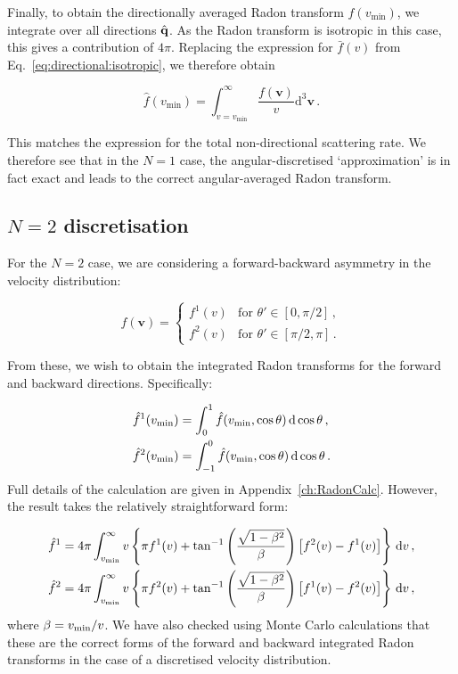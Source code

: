 Finally, to obtain the directionally averaged Radon transform $\hat{f}(v_\textrm{min})$, we integrate over all directions $\hat{\textbf{q}}$. As the Radon transform is isotropic in this case, this gives a contribution of $4\pi$. Replacing the expression for $\bar{f}(v)$ from Eq.~\ref{eq:directional:isotropic}, we therefore obtain

\begin{equation}
\hat{f}\left(v_\textrm{min}\right) = \int_{v=v_\textrm{min}}^\infty \frac{f(\textbf{v})}{v} \mathrm{d}^3\textbf{v}\,.
\end{equation}

This matches the expression for the total non-directional scattering rate. We therefore see that in the $N=1$ case, the angular-discretised `approximation' is in fact exact and leads to the correct angular-averaged Radon transform.


\subsection{$N=2$ discretisation}


For the $N=2$ case, we are considering a forward-backward asymmetry in the velocity distribution:

\begin{equation}
\label{eq:directional:N2}
f(\mathbf{v}) =
\begin{cases}
f^1(v) & \textrm{for } \theta' \in [0, \pi/2]\,, \\
f^2(v) & \textrm{for } \theta' \in [\pi/2, \pi]\,.
\end{cases}
\end{equation}

From these, we wish to obtain the integrated Radon transforms for the forward and backward directions. Specifically:

\begin{align}
\hat{f}^1(\vmin) &= \int_{0}^1 \hat{f}(\vmin,\cos\theta) \, \mathrm{d}\cos\theta\,, \\
\hat{f}^2(\vmin) &= \int_{-1}^0 \hat{f}(\vmin, \cos\theta) \, \mathrm{d}\cos\theta \,.
\end{align}
Full details of the calculation are given in Appendix~\ref{ch:RadonCalc}. However, the result takes the relatively straightforward form:

\begin{align}
\label{eq:directional:N2result}
\hat{f}^1 &= 4\pi\int_{\vmin}^{\infty} v \left\{ \pi f^1(v) + \atan\left(\frac{\sqrt{1-\beta^2}}{\beta}\right)\left[f^2(v) - f^1(v)\right] \right\} \, \mathrm{d}v \,,\\
\hat{f}^2 &= 4\pi\int_{\vmin}^{\infty} v \left\{ \pi f^2(v) + \atan\left(\frac{\sqrt{1-\beta^2}}{\beta}\right)\left[f^1(v) - f^2(v)\right] \right\} \, \mathrm{d}v\,,
\end{align}
where $\beta = \vmin/v$. We have also checked using Monte Carlo calculations that these are the correct forms of the forward and backward integrated Radon transforms in the case of a discretised velocity distribution.


